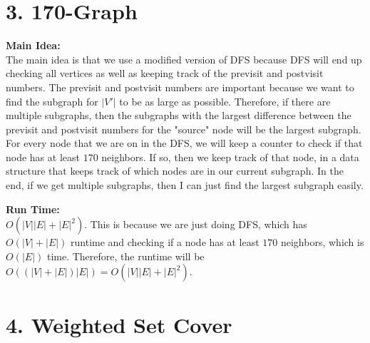 \documentclass[11pt]{article}
\newenvironment{mainIdea}{\par{\bf Main Idea:}}{\smallskip}
\newenvironment{runTime}{\par{\bf Run Time:}}{\smallskip}
\begin{document}
\section*{3. 170-Graph}
\begin{mainIdea}
\\
The main idea is that we use a modified version of DFS because DFS will end up checking all vertices as well as keeping track of the previsit and postvisit numbers. The previsit and postvisit numbers are important because we want to find the subgraph for $|V'|$ to be as large as possible. Therefore, if there are multiple subgraphs, then the subgraphs with the largest difference between the previsit and postvisit numbers for the "source" node will be the largest subgraph. For every node that we are on in the DFS, we will keep a counter to check if that node has at least $170$ neighbors. If so, then we keep track of that node, in a data structure that keeps track of which nodes are in our current subgraph. In the end, if we get multiple subgraphs, then I can just find the largest subgraph easily.
\end{mainIdea}
\\
\begin{runTime}
\\
$O(|V||E| + |E| ^ 2)$. This is because we are just doing DFS, which has $O(|V| + |E|)$ runtime and checking if a node has at least $170$ neighbors, which is $O(|E|)$ time. Therefore, the runtime will be $O((|V| + |E|) |E|) = O(|V||E| + |E| ^ 2)$.
\end{runTime}



\newpage
\section*{4. Weighted Set Cover}





\newpage
\end{document}
